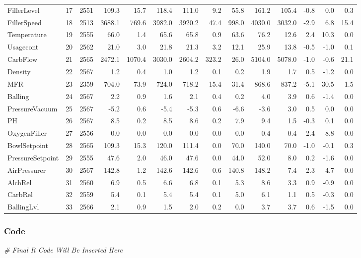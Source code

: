 \documentclass[]{report}
\newenvironment{Shaded}{\begin{snugshade}}{\end{snugshade}}
\newcommand{\CommentTok}[1]{\textcolor[rgb]{0.56,0.35,0.01}{\textit{#1}}}
\begin{document}
\begin{table}[H]
\begin{tabular}{lrrrrrrrrrrrrr}
\rowcolor{gray!6}  FillerLevel & 17 & 2551 & 109.3 & 15.7 & 118.4 & 111.0 & 9.2 & 55.8 & 161.2 & 105.4 & -0.8 & 0.0 & 0.3\\
FillerSpeed & 18 & 2513 & 3688.1 & 769.6 & 3982.0 & 3920.2 & 47.4 & 998.0 & 4030.0 & 3032.0 & -2.9 & 6.8 & 15.4\\
\rowcolor{gray!6}  Temperature & 19 & 2555 & 66.0 & 1.4 & 65.6 & 65.8 & 0.9 & 63.6 & 76.2 & 12.6 & 2.4 & 10.3 & 0.0\\
Usagecont & 20 & 2562 & 21.0 & 3.0 & 21.8 & 21.3 & 3.2 & 12.1 & 25.9 & 13.8 & -0.5 & -1.0 & 0.1\\
\addlinespace
\rowcolor{gray!6}  CarbFlow & 21 & 2565 & 2472.1 & 1070.4 & 3030.0 & 2604.2 & 323.2 & 26.0 & 5104.0 & 5078.0 & -1.0 & -0.6 & 21.1\\
Density & 22 & 2567 & 1.2 & 0.4 & 1.0 & 1.2 & 0.1 & 0.2 & 1.9 & 1.7 & 0.5 & -1.2 & 0.0\\
\rowcolor{gray!6}  MFR & 23 & 2359 & 704.0 & 73.9 & 724.0 & 718.2 & 15.4 & 31.4 & 868.6 & 837.2 & -5.1 & 30.5 & 1.5\\
Balling & 24 & 2567 & 2.2 & 0.9 & 1.6 & 2.1 & 0.4 & 0.2 & 4.0 & 3.9 & 0.6 & -1.4 & 0.0\\
\rowcolor{gray!6}  PressureVacuum & 25 & 2567 & -5.2 & 0.6 & -5.4 & -5.3 & 0.6 & -6.6 & -3.6 & 3.0 & 0.5 & 0.0 & 0.0\\
\addlinespace
PH & 26 & 2567 & 8.5 & 0.2 & 8.5 & 8.6 & 0.2 & 7.9 & 9.4 & 1.5 & -0.3 & 0.1 & 0.0\\
\rowcolor{gray!6}  OxygenFiller & 27 & 2556 & 0.0 & 0.0 & 0.0 & 0.0 & 0.0 & 0.0 & 0.4 & 0.4 & 2.4 & 8.8 & 0.0\\
BowlSetpoint & 28 & 2565 & 109.3 & 15.3 & 120.0 & 111.4 & 0.0 & 70.0 & 140.0 & 70.0 & -1.0 & -0.1 & 0.3\\
\rowcolor{gray!6}  PressureSetpoint & 29 & 2555 & 47.6 & 2.0 & 46.0 & 47.6 & 0.0 & 44.0 & 52.0 & 8.0 & 0.2 & -1.6 & 0.0\\
AirPressurer & 30 & 2567 & 142.8 & 1.2 & 142.6 & 142.6 & 0.6 & 140.8 & 148.2 & 7.4 & 2.3 & 4.7 & 0.0\\
\addlinespace
\rowcolor{gray!6}  AlchRel & 31 & 2560 & 6.9 & 0.5 & 6.6 & 6.8 & 0.1 & 5.3 & 8.6 & 3.3 & 0.9 & -0.9 & 0.0\\
CarbRel & 32 & 2559 & 5.4 & 0.1 & 5.4 & 5.4 & 0.1 & 5.0 & 6.1 & 1.1 & 0.5 & -0.3 & 0.0\\
\rowcolor{gray!6}  BallingLvl & 33 & 2566 & 2.1 & 0.9 & 1.5 & 2.0 & 0.2 & 0.0 & 3.7 & 3.7 & 0.6 & -1.5 & 0.0\\
\bottomrule
\end{tabular}
\endgroup{}
\end{table}

\hypertarget{code}{%
\subsubsection{Code}\label{code}}

\begin{Shaded}
\begin{Highlighting}[]
\CommentTok{# Final R Code Will Be Inserted Here}
\end{Highlighting}
\end{Shaded}
\end{document}

